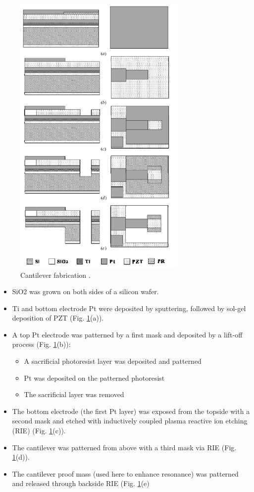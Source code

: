 \begin{figure}
\centering
\includegraphics[width=0.75\textwidth]{cantifab}
\caption{Cantilever fabrication \cite{shen2008design}.}
\label{fig:fab}
\end{figure}

\begin{itemize}
\item SiO2 was grown on both sides of a silicon wafer.
\item Ti and bottom electrode Pt were deposited by sputtering, followed by sol-gel deposition of PZT (Fig. \ref{fig:fab}(a)).
\item A top Pt electrode was patterned by a first mask and deposited by a lift-off process (Fig. \ref{fig:fab}(b)):
  \begin{itemize}
  \item A sacrificial photoresist layer was deposited and patterned
  \item Pt was deposited on the patterned photoresist
  \item The sacrificial layer was removed
  \end{itemize}
\item The bottom electrode (the first Pt layer) was exposed from the topside with a second mask and etched with inductively coupled plasma reactive ion etching (RIE) (Fig. \ref{fig:fab}(c)).
\item The cantilever was patterned from above with a third mask via RIE (Fig. \ref{fig:fab}(d)).
\item The cantilever proof mass (used here to enhance resonance) was patterned and released through backside RIE (Fig. \ref{fig:fab}(e)
\end{itemize}

